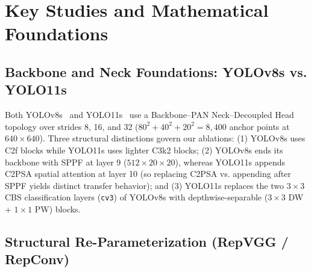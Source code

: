 \section{Key Studies and Mathematical Foundations}

\subsection{Backbone and Neck Foundations: YOLOv8s vs. YOLO11s}

Both YOLOv8s~\cite{jocher2023yolov8} and YOLO11s~\cite{ultralytics2024yolo11} use a Backbone--PAN Neck--Decoupled Head topology over strides 8, 16, and 32 ($80^2 + 40^2 + 20^2 = 8,400$ anchor points at $640 \times 640$). Three structural distinctions govern our ablations: (1) YOLOv8s uses C2f blocks while YOLO11s uses lighter C3k2 blocks; (2) YOLOv8s ends its backbone with SPPF at layer 9 ($512 \times 20 \times 20$), whereas YOLO11s appends C2PSA spatial attention at layer 10 (so replacing C2PSA vs. appending after SPPF yields distinct transfer behavior); and (3) YOLO11s replaces the two $3 \times 3$ CBS classification layers (\texttt{cv3}) of YOLOv8s with depthwise-separable ($3 \times 3$ DW + $1 \times 1$ PW) blocks.

\subsection{Structural Re-Parameterization (RepVGG / RepConv)}

